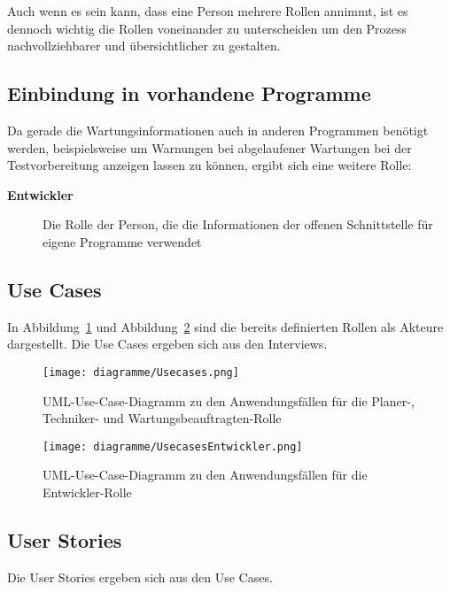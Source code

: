 Auch wenn es sein kann, dass eine Person mehrere Rollen annimmt, ist es dennoch 
wichtig die Rollen voneinander zu unterscheiden um den Prozess nachvollziehbarer
und übersichtlicher zu gestalten.

\subsection{Einbindung in vorhandene Programme}
Da gerade die Wartungsinformationen auch in anderen Programmen benötigt werden, 
beispielsweise um Warnungen bei abgelaufener Wartungen bei der Testvorbereitung
anzeigen lassen zu können, ergibt sich eine weitere Rolle:

\begin{description}
    \item[\textbf{Entwickler}] Die Rolle der Person, die die Informationen der
    offenen Schnittstelle für eigene Programme verwendet
\end{description}

\subsection{Use Cases}\label{sec:usecases}
In Abbildung~\ref{fig:usecases} und Abbildung~\ref{fig:usecasesEntwickler} sind 
die bereits definierten Rollen als Akteure dargestellt.
Die Use Cases ergeben sich aus den Interviews.

\begin{figure}[H]
    \texttt{[image: diagramme/Usecases.png]}
    \caption{UML-Use-Case-Diagramm zu den Anwendungsfällen für die Planer-, Techniker- und Wartungsbeauftragten-Rolle}\label{fig:usecases}
\end{figure}

\begin{figure}[H]
    \texttt{[image: diagramme/UsecasesEntwickler.png]}
    \caption{UML-Use-Case-Diagramm zu den Anwendungsfällen für die Entwickler-Rolle}\label{fig:usecasesEntwickler}
\end{figure}

\subsection{User Stories}\label{sec:userstories}
Die User Stories ergeben sich aus den Use Cases.

